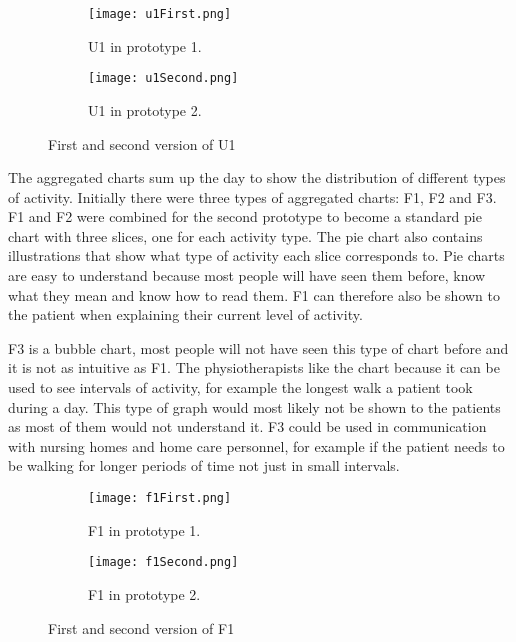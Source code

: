 \begin{figure}[h!]
  \centering
  \begin{subfigure}[b]{0.50\textwidth}
    \centering
    \texttt{[image: u1First.png]}
    \caption{U1 in prototype 1.}
  \end{subfigure}
  \begin{subfigure}[b]{0.49\textwidth}
    \centering
    \texttt{[image: u1Second.png]}
    \caption{U1 in prototype 2.}
  \end{subfigure} 
  \caption{First and second version of U1}
  \label{fig:uComparison}
\end{figure}

The aggregated charts sum up the day to show the distribution of different types of activity. Initially there were three types of aggregated charts: F1, F2 and F3. F1 and F2 were combined for the second prototype to become a standard pie chart with three slices, one for each activity type. The pie chart also contains illustrations that show what type of activity each slice corresponds to. Pie charts are easy to understand because most people will have seen them before, know what they mean and know how to read them. F1 can therefore also be shown to the patient when explaining their current level of activity. 

F3 is a bubble chart, most people will not have seen this type of chart before and it is not as intuitive as F1. The physiotherapists like the chart because it can be used to see intervals of activity, for example the longest walk a patient took during a day. This type of graph would most likely not be shown to the patients as most of them would not understand it. F3 could be used in communication with nursing homes and home care personnel, for example if the patient needs to be walking for longer periods of time not just in small intervals. 

\begin{figure}[h!]
  \centering
  \begin{subfigure}[b]{0.5\textwidth}
    \centering
    \texttt{[image: f1First.png]}
    \caption{F1 in prototype 1.}
  \end{subfigure}
  \begin{subfigure}[b]{0.49\textwidth}
    \centering
    \texttt{[image: f1Second.png]}
    \caption{F1 in prototype 2.}
  \end{subfigure} 
  \caption{First and second version of F1}
  \label{fig:fComparison}
\end{figure} 

